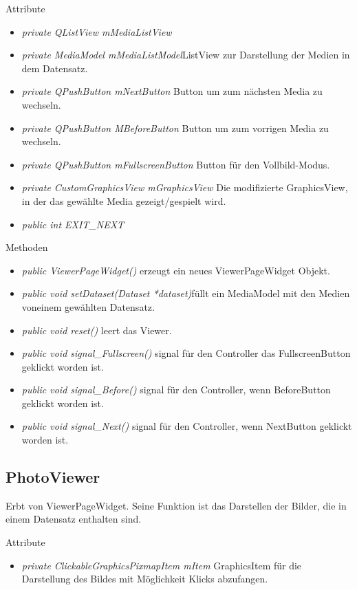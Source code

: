 Attribute
\begin{itemize}
	\item\textit{private QListView mMediaListView}
	
	\item\textit{private MediaModel mMediaListModel}ListView zur Darstellung der Medien in dem Datensatz.
	\item\textit{private QPushButton mNextButton}
	Button um zum nächsten Media zu wechseln. 
	\item\textit{private QPushButton MBeforeButton}
	Button um zum vorrigen Media zu wechseln.
	\item\textit{private QPushButton mFullscreenButton}
	Button für den Vollbild-Modus.
	\item\textit{private CustomGraphicsView mGraphicsView} Die modifizierte GraphicsView, in der das gewählte Media gezeigt/gespielt wird.  
	\item\textit{public int EXIT\_NEXT}      
\end{itemize}

Methoden
\begin{itemize}
	\item\textit{public ViewerPageWidget()} erzeugt ein neues ViewerPageWidget Objekt.
	\item\textit{public void setDataset(Dataset *dataset)}füllt ein MediaModel mit den Medien voneinem gewählten Datensatz.
	\item\textit{public void reset()} leert das Viewer.
	\item\textit{public void signal\_Fullscreen()} signal für den Controller das FullscreenButton geklickt worden ist.
	\item\textit{public void signal\_Before()} 
	signal für den Controller, wenn BeforeButton geklickt worden ist.
	\item\textit{public void signal\_Next()} signal für den Controller, wenn NextButton geklickt worden ist.
\end{itemize}

\subsection*{PhotoViewer}
Erbt von ViewerPageWidget. Seine Funktion ist das Darstellen der Bilder, die in einem Datensatz enthalten sind.

Attribute
\begin{itemize}
	\item\textit{private ClickableGraphicsPixmapItem mItem} GraphicsItem für die Darstellung des Bildes mit Möglichkeit Klicks abzufangen. 
	   
\end{itemize}


